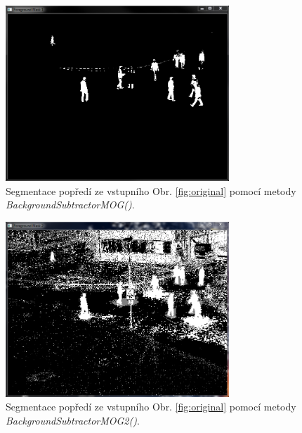 \documentclass[12pt, a4paper]{article}
\begin{document}
\begin{figure}[!ht]
	\centering
	\includegraphics[width = 0.75\textwidth]{./bs1.png}
	\caption{Segmentace popředí ze vstupního Obr. \ref{fig:original} pomocí metody \textit{BackgroundSubtractorMOG()}.}
\end{figure}

\pagebreak

\begin{figure}[!ht]
	\centering
	\includegraphics[width = 0.75\textwidth]{./bs2.png}
	\caption{Segmentace popředí ze vstupního Obr. \ref{fig:original} pomocí metody \textit{BackgroundSubtractorMOG2()}.}
\end{figure}
\end{document}
